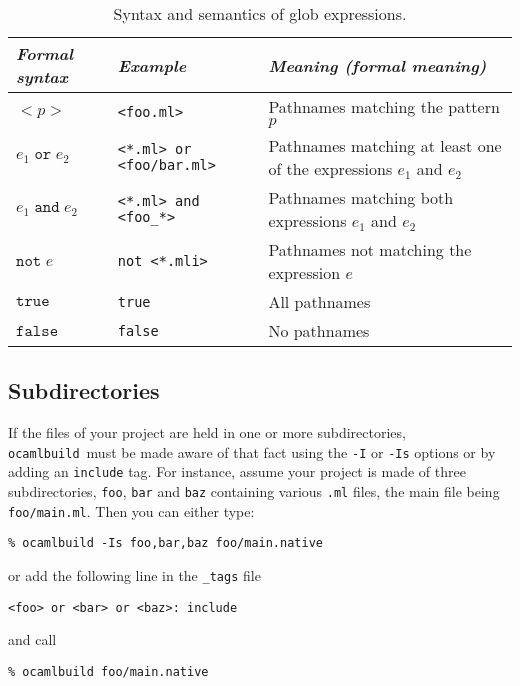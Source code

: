 \documentclass[12pt]{article}
\newcommand{\ocb}{\texttt{ocamlbuild}~}
\begin{document}
\begin{table}
  \begin{center}
    \small
    \begin{tabular}{|p{2cm}|l|p{7cm}|}
    \hline
      {\em Formal syntax} &
      {\em Example} &
      {\em Meaning (formal meaning)} \\
    \hline
    \hline
      {$\mathtt{<}p\mathtt{>}$} &
      \texttt{<foo.ml>} &
      Pathnames matching the pattern $p$ \\
    \hline
      {$e_1 \; \mathtt{or} \; e_2$} &
      \texttt{<*.ml> or <foo/bar.ml>} &
      Pathnames matching at least one of the expressions $e_1$ and $e_2$ \\
    \hline
      {$e_1 \; \mathtt{and} \; e_2$} &
      \texttt{<*.ml> and <foo\_*>} &
      Pathnames matching both expressions $e_1$ and $e_2$ \\
    \hline
      {$\mathtt{not} \; e$} &
      \texttt{not <*.mli>} &
      Pathnames not matching the expression $e$ \\
    \hline
      {$\mathtt{true}$} &
      \texttt{true} &
      All pathnames \\
    \hline
      {$\mathtt{false}$} &
      \texttt{false} &
      No pathnames \\
    \hline
    \end{tabular}
  \end{center}
  \caption{
    Syntax and semantics of glob expressions.
  }
\end{table}
\subsection{Subdirectories}
If the files of your project are held in one or more subdirectories, 
\ocb must be made aware of that fact using the \texttt{-I} or \texttt{-Is} options
or by adding an \texttt{include} tag.  For instance, assume your project is made
of three subdirectories, \texttt{foo}, \texttt{bar} and \texttt{baz} containing
various \texttt{.ml} files, the main file being \texttt{foo/main.ml}.  Then you can
either type:
\begin{verbatim}
% ocamlbuild -Is foo,bar,baz foo/main.native
\end{verbatim}
or add the following line in the \texttt{\_tags} file
\begin{verbatim}
<foo> or <bar> or <baz>: include
\end{verbatim}
and call
\begin{verbatim}
% ocamlbuild foo/main.native
\end{verbatim}
\end{document}
